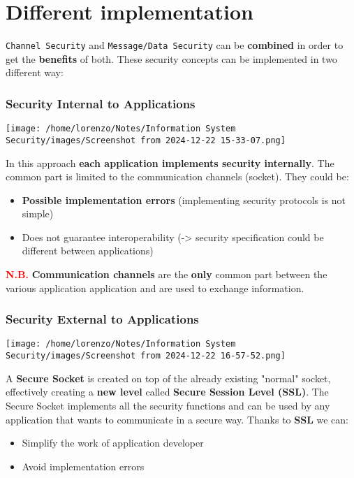 \section{Different implementation}
\texttt{Channel Security} and \texttt{Message/Data Security} can be \textbf{combined} in order to get the \textbf{benefits} of both. These security concepts can be  implemented in two different way:
\\
\newline
\begin{minipage}{0.5\textwidth}
    \subsubsection{Security Internal to Applications}
    \begin{center}
        \texttt{[image: /home/lorenzo/Notes/Information System Security/images/Screenshot from 2024-12-22 15-33-07.png]}
    \end{center}
    In this approach \textbf{each application implements security internally}. The common part is limited to the communication channels (socket). They could be:
    \begin{itemize}
        \item  \textbf{Possible implementation errors} (implementing security protocols is not simple)
        \item Does not guarantee interoperability (-> security specification could be different between applications)
    \end{itemize}
    \textcolor{red}{\textbf{N.B.}} \textbf{Communication channels} are the \textbf{only} common part between the various application application and are used to exchange information.
\end{minipage} 
\hspace{0.5cm}
\begin{minipage}{0.5\textwidth}
    \vspace{-1cm}
    \subsubsection{Security External to Applications}
    \begin{center}
        \centering
        \texttt{[image: /home/lorenzo/Notes/Information System Security/images/Screenshot from 2024-12-22 16-57-52.png]}
    \end{center}
    A \textbf{Secure Socket} is created on top of the already existing "normal" socket, effectively creating a \textbf{new level} called \textbf{Secure Session Level (SSL)}. The Secure Socket implements all the security functions and can be used by any application that wants to communicate in a secure way. Thanks to \textbf{SSL} we can: 
    \begin{itemize}
        \item Simplify the work of application developer
        \item Avoid implementation errors
    \end{itemize}
\end{minipage}
\newline
\\
\noindent{\color{gray!50}\rule{\textwidth}{0.5pt}}
